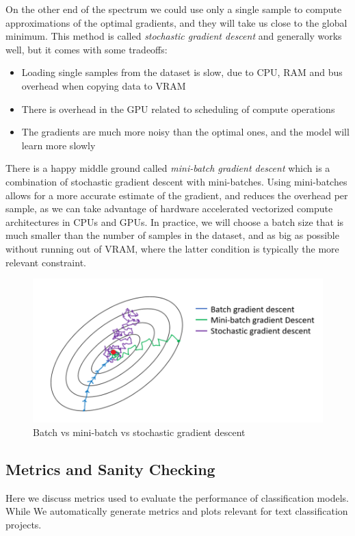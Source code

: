 On the other end of the spectrum we could use only a single sample to compute approximations of the optimal gradients, and they will take us close to the global minimum.
This method is called \textit{stochastic gradient descent} and generally works well, but it comes with some tradeoffs:
\begin{itemize}
    \item Loading single samples from the dataset is slow, due to CPU, RAM and bus overhead when copying data to VRAM
    \item There is overhead in the GPU related to scheduling of compute operations
    \item The gradients are much more noisy than the optimal ones, and the model will learn more slowly
\end{itemize}
There is a happy middle ground called \textit{mini-batch gradient descent} which is a combination of stochastic gradient descent with mini-batches.
Using mini-batches allows for a more accurate estimate of the gradient, and reduces the overhead per sample, as we can take advantage of hardware accelerated vectorized compute architectures in CPUs and GPUs.
In practice, we will choose a batch size that is much smaller than the number of samples in the dataset, and as big as possible without running out of VRAM, where the latter condition is typically the more relevant constraint.

\begin{figure}[h]
    \includegraphics[width=\linewidth]{chapters/NLP/figures/mini-batch.png}
    \caption{Batch vs mini-batch vs stochastic gradient descent}
    \label{fig:mini-batch}
\end{figure}

\subsection{Metrics and Sanity Checking}
\label{metrics_and_sanity_checking}
Here we discuss metrics used to evaluate the performance of classification models.
While
We automatically generate metrics and plots relevant for text classification projects.
